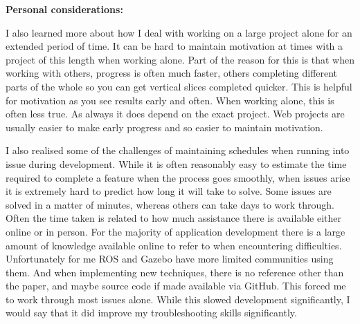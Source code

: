 \documentclass[]{../resources/final_report}
\begin{document}

\textbf{Personal considerations:}

I also learned more about how I deal with working on a large project alone for an extended period of 
time. It can be hard to maintain motivation at times with a project of this length when working alone.
Part of the reason for this is that when working with others, progress is often much faster, others 
completing different parts of the whole so you can get vertical slices completed quicker. This is helpful
for motivation as you see results early and often. When working alone, this is often less true. As always
it does depend on the exact project. Web projects are usually easier to make early progress and so easier
to maintain motivation.


I also realised some of the challenges of maintaining schedules when running into issue during development.
While it is often reasonably easy to estimate the time required to complete a feature when the process
goes smoothly, when issues arise it is extremely hard to predict how long it will take to solve. Some issues
are solved in a matter of minutes, whereas others can take days to work through. Often the time taken is 
related to how much assistance there is available either online or in person. For the majority of application development there is 
a large amount of knowledge available online to refer to when encountering difficulties. 
Unfortunately for me ROS and Gazebo have more limited communities using them. And when 
implementing new techniques, there is no reference other than the paper, and maybe source code
if made available via GitHub. This forced me 
to work through most issues alone. While this slowed development significantly, I would say that it did 
improve my troubleshooting skills significantly.



\newpage



\label{endpage}

\begin{appendices}



  
\end{appendices}
  
\end{document}
